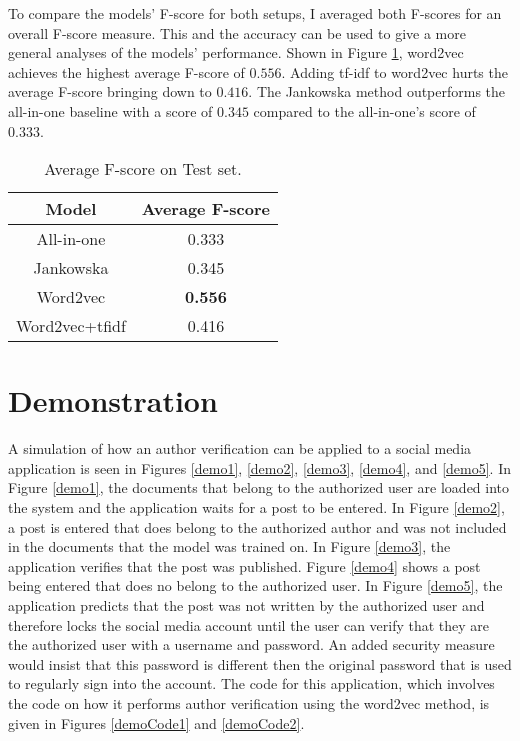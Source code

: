 \documentclass[11pt]{article}
\begin{document}
To compare the models' F-score for both setups, I averaged both F-scores for an overall F-score measure. This and the accuracy can be used to give a more general analyses of the models' performance. Shown in Figure \ref{average}, word2vec achieves the highest average F-score of $0.556$. Adding tf-idf to word2vec hurts the average F-score bringing down to $0.416$. The Jankowska method outperforms the all-in-one baseline with a score of $0.345$ compared to the all-in-one's score of $0.333$.


\begin{table}
\begin{center}
\small
\setlength{\tabcolsep}{2pt}
\begin{tabular}{c|c}

Model & Average F-score\\
\hline
All-in-one &  0.333\\
Jankowska & 0.345\\
Word2vec &  \textbf{0.556}\\
Word2vec+tfidf & 0.416\\
\hline


\end{tabular}
\caption{Average F-score on Test set. \label{average}}
\end{center}
\end{table}

\section{Demonstration}
A simulation of how an author verification can be applied to a social media application is seen in Figures \ref{demo1}, \ref{demo2}, \ref{demo3}, \ref{demo4}, and \ref{demo5}. In Figure \ref{demo1}, the documents that belong to the authorized user are loaded into the system and the application waits for a post to be entered. In Figure \ref{demo2}, a post is entered that does belong to the authorized author and was not included in the documents that the model was trained on. In Figure \ref{demo3}, the application verifies that the post was published. Figure \ref{demo4} shows a post being entered that does no belong to the authorized user. In Figure \ref{demo5}, the application predicts that the post was not written by the authorized user and therefore locks the social media account until the user can verify that they are the authorized user with a username and password. An added security measure would insist that this password is different then the original password that is used to regularly sign into the account. The code for this application, which involves the code on how it performs author verification using the word2vec method, is given in Figures \ref{demoCode1} and \ref{demoCode2}.
\end{document}
